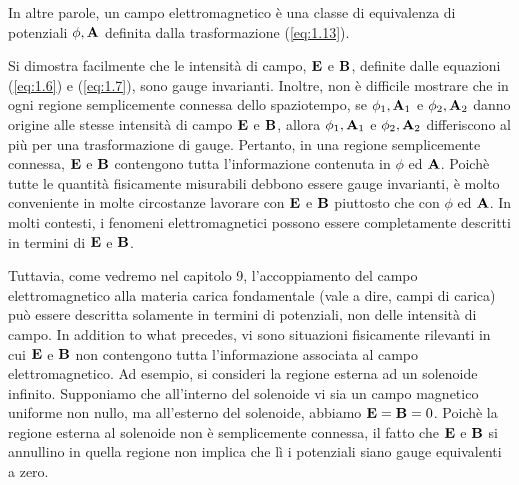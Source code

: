 In altre parole, un campo elettromagnetico è una classe di equivalenza di potenziali 
$\phi, \vb{A}$ definita dalla trasformazione (\ref{eq:1.13}). 

Si dimostra facilmente che le intensità di campo, $\vb{E}$ e $\vb{B}$, definite dalle equazioni (\ref{eq:1.6}) e (\ref{eq:1.7}), sono gauge invarianti. Inoltre, non è difficile mostrare che in ogni regione semplicemente connessa dello spaziotempo, se 
$\phi_1, \vb{A}_1$ e  $\phi_2, \vb{A}_2$ danno origine alle stesse intensità di campo $\vb{E}$ e $\vb{B}$, allora $\phi_1, \vb{A}_1$ e  $\phi_2, \vb{A}_2$ differiscono al più per una trasformazione di gauge. Pertanto, in una regione semplicemente connessa, 
$\vb{E}$ e $\vb{B}$ contengono tutta l'informazione contenuta in $\phi$ ed $\vb{A}$. 
Poichè tutte le quantità fisicamente misurabili debbono essere gauge invarianti, è molto conveniente in molte circostanze lavorare con $\vb{E}$ e $\vb{B}$ piuttosto che con $\phi$ ed $\vb{A}$. In molti contesti, i fenomeni elettromagnetici possono essere completamente descritti in termini di $\vb{E}$ e $\vb{B}$.

Tuttavia, come vedremo nel capitolo 9, l'accoppiamento del campo elettromagnetico alla materia carica fondamentale (vale a dire, campi di carica) può essere descritta solamente in termini di potenziali, non delle intensità di campo. In addition to what precedes, vi sono situazioni fisicamente rilevanti in cui $\vb{E}$ e $\vb{B}$ non contengono tutta l'informazione associata al campo elettromagnetico. Ad esempio, si consideri la regione esterna ad un solenoide infinito. Supponiamo che all'interno del solenoide vi sia un campo magnetico uniforme non nullo, ma all'esterno del solenoide, abbiamo $\vb{E} = \vb{B} = 0$. Poichè la regione esterna al solenoide non è semplicemente connessa, il fatto che $\vb{E}$ e $\vb{B}$ si annullino in quella regione non implica che lì i potenziali siano gauge equivalenti a zero.  